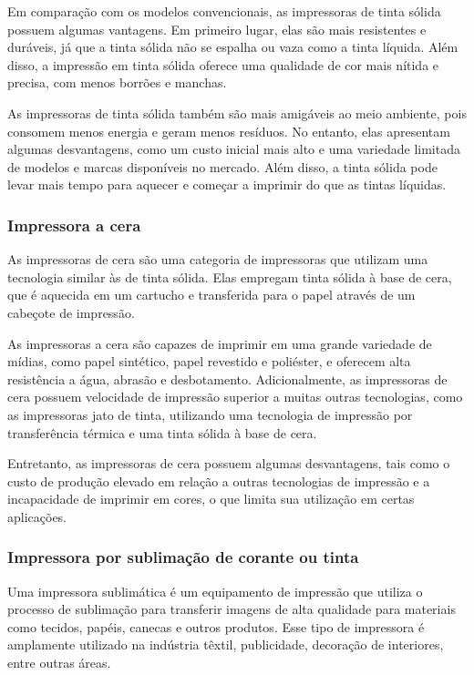 \documentclass[12pt,a4, oneside, brazil]{article}
\begin{document}
			Em comparação com os modelos convencionais, as impressoras de tinta sólida possuem algumas vantagens. Em primeiro lugar, elas são mais resistentes e duráveis, já que a tinta sólida não se espalha ou vaza como a tinta líquida. Além disso, a impressão em tinta sólida oferece uma qualidade de cor mais nítida e precisa, com menos borrões e manchas.
			 
			As impressoras de tinta sólida também são mais amigáveis ao meio ambiente, pois consomem menos energia e geram menos resíduos. No entanto, elas apresentam algumas desvantagens, como um custo inicial mais alto e uma variedade limitada de modelos e marcas disponíveis no mercado. Além disso, a tinta sólida pode levar mais tempo para aquecer e começar a imprimir do que as tintas líquidas.
			
			\subsubsection{Impressora a cera}
			
			As impressoras de cera são uma categoria de impressoras que utilizam uma tecnologia similar às de tinta sólida. Elas empregam tinta sólida à base de cera, que é aquecida em um cartucho e transferida para o papel através de um cabeçote de impressão.
			
		 	As impressoras a cera são capazes de imprimir em uma grande variedade de mídias, como papel sintético, papel revestido e poliéster, e oferecem alta resistência a água, abrasão e desbotamento. Adicionalmente, as impressoras de cera possuem velocidade de impressão superior a muitas outras tecnologias, como as impressoras jato de tinta, utilizando uma tecnologia de impressão por transferência térmica e uma tinta sólida à base de cera.
			
			Entretanto, as impressoras de cera possuem algumas desvantagens, tais como o custo de produção elevado em relação a outras tecnologias de impressão e a incapacidade de imprimir em cores, o que limita sua utilização em certas aplicações.
			
			\subsubsection{Impressora por sublimação de corante ou tinta}
			Uma impressora sublimática é um equipamento de impressão que utiliza o processo de sublimação para transferir imagens de alta qualidade para materiais como tecidos, papéis, canecas e outros produtos. Esse tipo de impressora é amplamente utilizado na indústria têxtil, publicidade, decoração de interiores, entre outras áreas.
			
\end{document}
